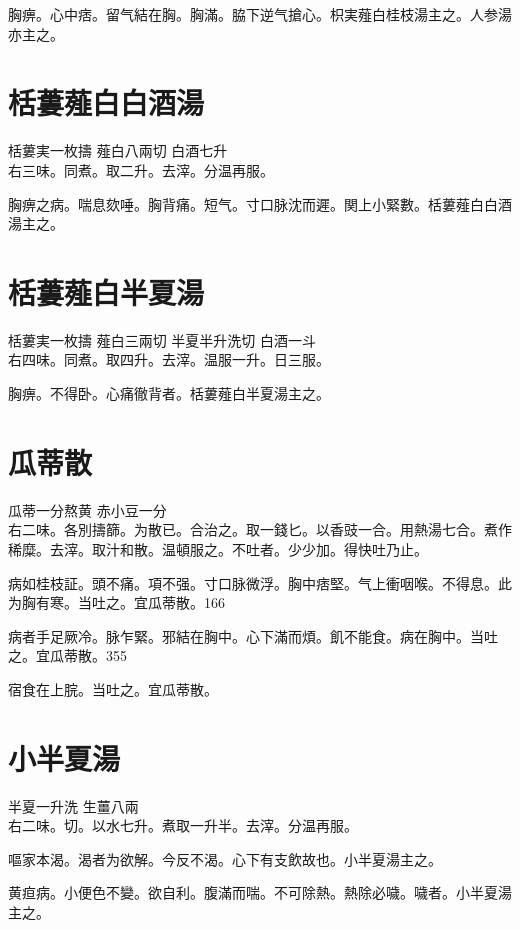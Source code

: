 胸痹。心中痞。留气結在胸。胸滿。脇下逆{\khaaitp 气}搶心。枳実薤白桂枝湯主之。人参湯亦主之。

\section{栝蔞薤白白酒湯}

栝蔞実{\scriptsize 一枚擣} 薤白{\scriptsize 八兩切} 白酒{\scriptsize 七升}\\
右三味。同煮。取二升。去滓。分温再服。

胸痹之病。喘息欬唾。胸背痛。短气。寸口脉沈而遲。関上小緊數。栝蔞薤白白酒湯主之。

\section{栝蔞薤白半夏湯}

栝蔞実{\scriptsize 一枚擣} 薤白{\scriptsize 三兩切} 半夏{\scriptsize 半升洗切} 白酒{\scriptsize 一斗}\\
右四味。同煮。取四升。去滓。温服一升。日三服。

胸痹。不得卧。心痛徹背者。栝蔞薤白半夏湯主之。

\section{瓜蒂散}

瓜蒂{\scriptsize 一分熬黄} 赤小豆{\scriptsize 一分}\\
右二味。各別擣篩。为散已。合治之。取一錢匕。以香豉一合。用熱湯七合。煮作稀糜。去滓。取汁和散。温頓服之。不吐者。少少加。得快吐乃止。

病如桂枝証。頭不痛。項不强。寸{\khaaitp 口}脉微浮。胸中痞堅。气上衝咽喉。不得息。此为胸有寒。当吐之。宜瓜蒂散。166

病者手足厥冷。脉乍緊。邪結在胸中。心下滿而煩。飢不能食。病在胸中。当吐之。宜瓜蒂散。355

宿食在上脘。当吐之。宜瓜蒂散。

\section{小半夏湯}

半夏{\scriptsize 一升洗} 生薑{\scriptsize 八兩}\\
右二味。切。以水七升。煮取一升半。去滓。分温再服。

嘔家本渴。渴者为欲解。今反不渴。心下有支飲故也。小半夏湯主之。

黄疸病。小便色不變。欲自利。腹滿而喘。不可除熱。熱除必噦。噦者。小半夏湯主之。

